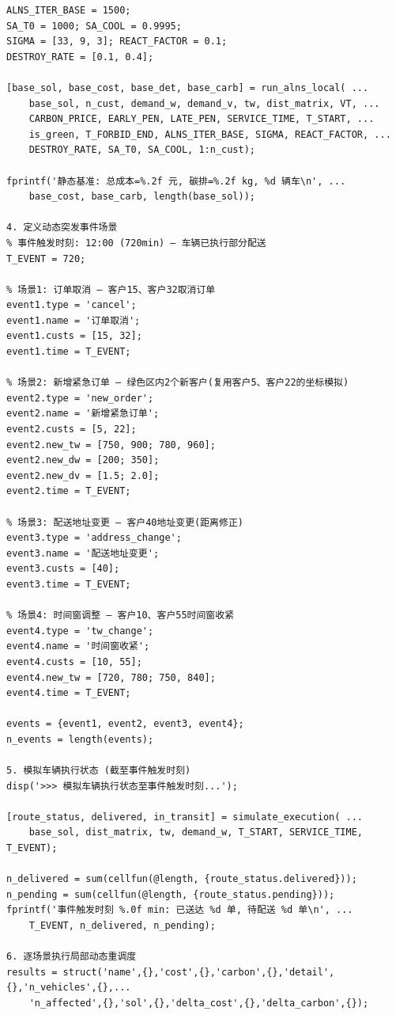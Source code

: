 {\begin{verbatim}
ALNS_ITER_BASE = 1500;
SA_T0 = 1000; SA_COOL = 0.9995;
SIGMA = [33, 9, 3]; REACT_FACTOR = 0.1;
DESTROY_RATE = [0.1, 0.4];

[base_sol, base_cost, base_det, base_carb] = run_alns_local( ...
    base_sol, n_cust, demand_w, demand_v, tw, dist_matrix, VT, ...
    CARBON_PRICE, EARLY_PEN, LATE_PEN, SERVICE_TIME, T_START, ...
    is_green, T_FORBID_END, ALNS_ITER_BASE, SIGMA, REACT_FACTOR, ...
    DESTROY_RATE, SA_T0, SA_COOL, 1:n_cust);

fprintf('静态基准: 总成本=%.2f 元, 碳排=%.2f kg, %d 辆车\n', ...
    base_cost, base_carb, length(base_sol));

4. 定义动态突发事件场景
% 事件触发时刻: 12:00 (720min) — 车辆已执行部分配送
T_EVENT = 720;

% 场景1: 订单取消 — 客户15、客户32取消订单
event1.type = 'cancel';
event1.name = '订单取消';
event1.custs = [15, 32];
event1.time = T_EVENT;

% 场景2: 新增紧急订单 — 绿色区内2个新客户(复用客户5、客户22的坐标模拟)
event2.type = 'new_order';
event2.name = '新增紧急订单';
event2.custs = [5, 22];
event2.new_tw = [750, 900; 780, 960];
event2.new_dw = [200; 350];
event2.new_dv = [1.5; 2.0];
event2.time = T_EVENT;

% 场景3: 配送地址变更 — 客户40地址变更(距离修正)
event3.type = 'address_change';
event3.name = '配送地址变更';
event3.custs = [40];
event3.time = T_EVENT;

% 场景4: 时间窗调整 — 客户10、客户55时间窗收紧
event4.type = 'tw_change';
event4.name = '时间窗收紧';
event4.custs = [10, 55];
event4.new_tw = [720, 780; 750, 840];
event4.time = T_EVENT;

events = {event1, event2, event3, event4};
n_events = length(events);

5. 模拟车辆执行状态 (截至事件触发时刻)
disp('>>> 模拟车辆执行状态至事件触发时刻...');

[route_status, delivered, in_transit] = simulate_execution( ...
    base_sol, dist_matrix, tw, demand_w, T_START, SERVICE_TIME, T_EVENT);

n_delivered = sum(cellfun(@length, {route_status.delivered}));
n_pending = sum(cellfun(@length, {route_status.pending}));
fprintf('事件触发时刻 %.0f min: 已送达 %d 单, 待配送 %d 单\n', ...
    T_EVENT, n_delivered, n_pending);

6. 逐场景执行局部动态重调度
results = struct('name',{},'cost',{},'carbon',{},'detail',{},'n_vehicles',{},...
    'n_affected',{},'sol',{},'delta_cost',{},'delta_carbon',{});


\end{verbatim}}
